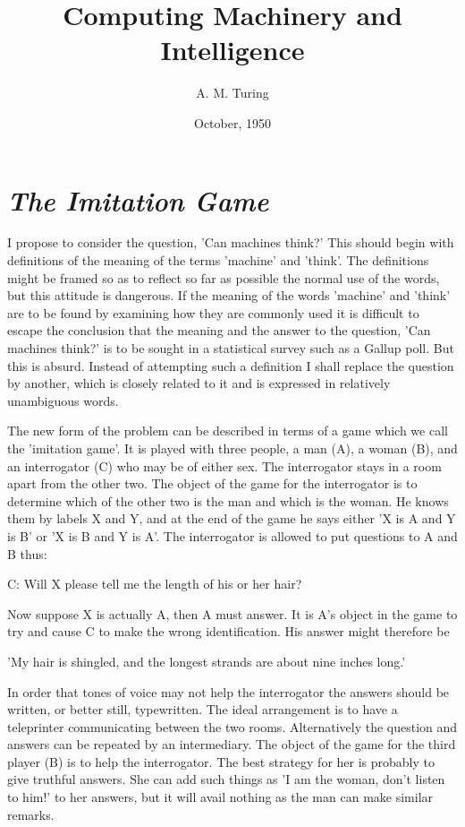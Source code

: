 \documentclass[12pt]{article}
\title{Computing Machinery and Intelligence}
\author{A. M. Turing}
\date{October, 1950}
\begin{document}
    \maketitle
    \thispagestyle{empty}
    \pagebreak

    \tableofcontents
    \pagebreak

    \section{\textit{The Imitation Game}}
    I propose to consider the question, 'Can machines think?' This should begin with definitions of the meaning of the terms 'machine' and 'think'. The definitions might be framed so as to reflect so far as possible the normal use of the words, but this attitude is dangerous. If the meaning of the words 'machine' and 'think' are to be found by examining how they are commonly used it is difficult to escape the conclusion that the meaning and the answer to the question, 'Can machines think?' is to be sought in a statistical survey such as a Gallup poll. But this is absurd. Instead of attempting such a definition I shall replace the question by another, which is closely related to it and is expressed in relatively unambiguous words.

    The new form of the problem can be described in terms of a game which we call the 'imitation game'. It is played with three people, a man (A), a woman (B), and an interrogator (C) who may be of either sex. The interrogator stays in a room apart from the other two. The object of the game for the interrogator is to determine which of the other two is the man and which is the woman. He knows them by labels X and Y, and at the end of the game he says either 'X is A and Y is B' or 'X is B and Y is A'. The interrogator is allowed to put questions to A and B thus:

    C: Will X please tell me the length of his or her hair?

    \noindent
    Now suppose X is actually A, then A must answer. It is A's object in the game to try and cause C to make the wrong identification. His answer might therefore be

    'My hair is shingled, and the longest strands are about nine inches long.'

    In order that tones of voice may not help the interrogator the answers should be written, or better still, typewritten. The ideal arrangement is to have a teleprinter communicating between the two rooms. Alternatively the question and answers can be repeated by an intermediary. The object of the game for the third player (B) is to help the interrogator. The best strategy for her is probably to give truthful answers. She can add such things as 'I am the woman, don't listen to him!' to her answers, but it will avail nothing as the man can make similar remarks.
\end{document}
